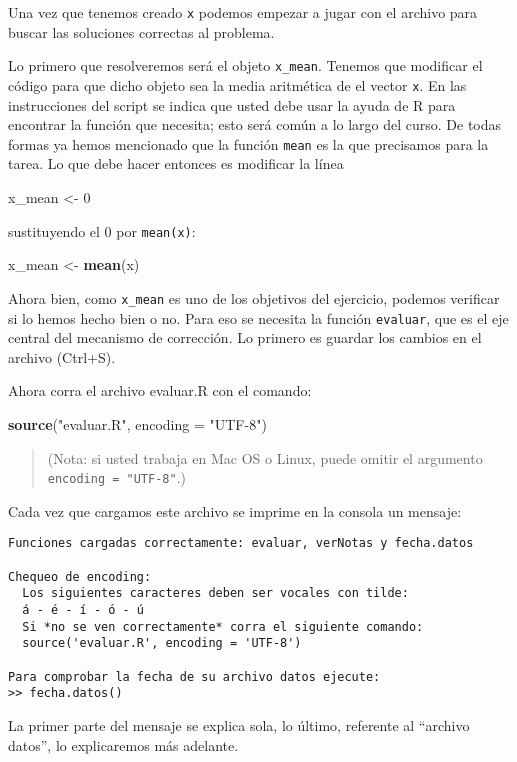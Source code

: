 \documentclass[]{article}
\newenvironment{Shaded}{}{}
\newcommand{\KeywordTok}[1]{\textcolor[rgb]{0.00,0.44,0.13}{\textbf{{#1}}}}
\newcommand{\DataTypeTok}[1]{\textcolor[rgb]{0.56,0.13,0.00}{{#1}}}
\newcommand{\DecValTok}[1]{\textcolor[rgb]{0.25,0.63,0.44}{{#1}}}
\newcommand{\StringTok}[1]{\textcolor[rgb]{0.25,0.44,0.63}{{#1}}}
\newcommand{\NormalTok}[1]{{#1}}
\begin{document}
Una vez que tenemos creado \texttt{x} podemos empezar a jugar con el
archivo para buscar las soluciones correctas al problema.

Lo primero que resolveremos será el objeto \texttt{x\_mean}. Tenemos que
modificar el código para que dicho objeto sea la media aritmética de el
vector \texttt{x}. En las instrucciones del script se indica que usted
debe usar la ayuda de R para encontrar la función que necesita; esto
será común a lo largo del curso. De todas formas ya hemos mencionado que
la función \texttt{mean} es la que precisamos para la tarea. Lo que debe
hacer entonces es modificar la línea

\begin{Shaded}
\begin{Highlighting}[]
\NormalTok{x_mean <- }\DecValTok{0}
\end{Highlighting}
\end{Shaded}
sustituyendo el 0 por \texttt{mean(x)}:

\begin{Shaded}
\begin{Highlighting}[]
\NormalTok{x_mean <- }\KeywordTok{mean}\NormalTok{(x)}
\end{Highlighting}
\end{Shaded}
Ahora bien, como \texttt{x\_mean} es uno de los objetivos del ejercicio,
podemos verificar si lo hemos hecho bien o no. Para eso se necesita la
función \texttt{evaluar}, que es el eje central del mecanismo de
corrección. Lo primero es guardar los cambios en el archivo (Ctrl+S).

Ahora corra el archivo evaluar.R con el comando:

\begin{Shaded}
\begin{Highlighting}[]
\KeywordTok{source}\NormalTok{(}\StringTok{"evaluar.R"}\NormalTok{, }\DataTypeTok{encoding =} \StringTok{"UTF-8"}\NormalTok{)}
\end{Highlighting}
\end{Shaded}
\begin{quote}
(Nota: si usted trabaja en Mac OS o Linux, puede omitir el argumento
\texttt{encoding = "UTF-8"}.)

\end{quote}
Cada vez que cargamos este archivo se imprime en la consola un mensaje:

\begin{verbatim}
Funciones cargadas correctamente: evaluar, verNotas y fecha.datos

Chequeo de encoding:
  Los siguientes caracteres deben ser vocales con tilde:
  á - é - í - ó - ú
  Si *no se ven correctamente* corra el siguiente comando:
  source('evaluar.R', encoding = 'UTF-8')

Para comprobar la fecha de su archivo datos ejecute:
>> fecha.datos()
\end{verbatim}
La primer parte del mensaje se explica sola, lo último, referente al
``archivo datos'', lo explicaremos más adelante.
\end{document}
